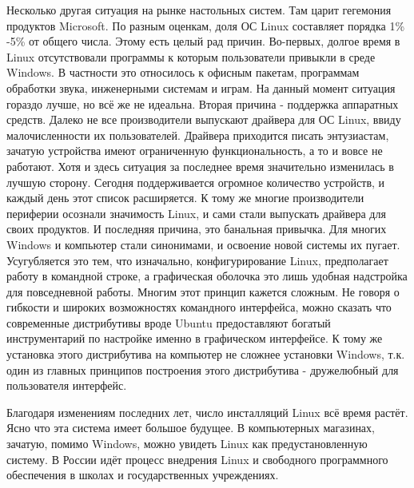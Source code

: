 \par Несколько другая ситуация на рынке настольных систем. Там царит гегемония продуктов Microsoft. По разным оценкам, доля ОС Linux составляет порядка 1\% -5\% от общего числа. Этому есть целый рад причин. Во-первых, долгое время в Linux отсутствовали программы к которым пользователи привыкли в среде Windows. В частности это относилось к офисным пакетам, программам обработки звука, инженерными системам и играм. На данный момент ситуация гораздо лучше, но всё же не идеальна. Вторая причина - поддержка аппаратных средств. Далеко не все производители выпускают драйвера для ОС Linux, ввиду малочисленности их пользователей. Драйвера приходится писать энтузиастам, зачатую устройства имеют ограниченную функциональность, а то и вовсе не работают. Хотя и здесь ситуация за последнее время значительно изменилась в лучшую сторону. Сегодня поддерживается огромное количество устройств, и каждый день этот список расширяется. К тому же многие производители периферии осознали значимость Linux, и сами стали выпускать драйвера для своих продуктов. И последняя причина, это банальная привычка. Для многих Windows и компьютер стали синонимами, и освоение новой системы их пугает. Усугубляется это тем, что изначально, конфигурирование Linux, предполагает работу в командной строке, а графическая оболочка это лишь удобная надстройка для повседневной работы. Многим этот принцип кажется сложным. Не говоря о гибкости и широких возможностях командного интерфейса, можно сказать что современные дистрибутивы вроде Ubuntu предоставляют богатый инструментарий по настройке именно в графическом интерфейсе. К тому же установка этого дистрибутива на компьютер не сложнее установки Windows, т.к. один из главных принципов построения этого дистрибутива - дружелюбный для пользователя интерфейс.
\par Благодаря изменениям последних лет, число инсталляций Linux всё время растёт. Ясно что эта система имеет большое будущее. В компьютерных магазинах, зачатую, помимо Windows, можно увидеть Linux как предустановленную систему. В России идёт процесс внедрения Linux и свободного программного обеспечения в школах и государственных учреждениях.